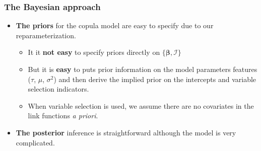 \documentclass[10pt,aspectratio=169]{beamer}
\begin{document}
\begin{frame}
  \frametitle{The Bayesian approach}
  \begin{itemize}

  \item \textbf{The priors} for the copula model are easy to specify due to our
    reparameterization.

    \begin{itemize}

    \item It it \textbf{not easy} to specify priors directly on
      $\{\bm{\beta},\bm{\mathcal{I}}\}$

    \item But it is \textbf{easy} to puts prior information on the model parameters
      features ($\tau$, $\mu$, $\sigma^2$) and then derive the implied prior on the
      intercepts and variable selection indicators.

    \item When variable selection is used, we assume there are no covariates in
      the link functions \emph{a priori}.

    \end{itemize}

  \item \textbf{The posterior} inference is straightforward although the model is very
    complicated.
  \end{itemize}
\end{frame}
\end{document}
